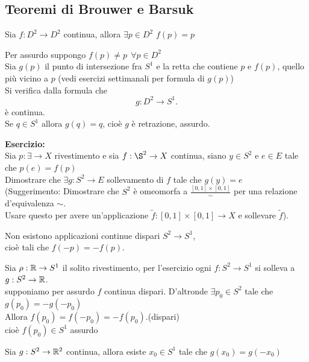 \documentclass[12px]{article}
\begin{document}
\subsection{Teoremi di Brouwer e Barsuk}
\begin{teo}[Brouwer]
	Sia $f:D^2 \rightarrow D^2$ continua, allora $\exists p\in D^2$ $f(p) = p$
\end{teo}
\begin{dimo}
	Per assurdo suppongo $f(p)\neq p \ \ \forall p\in D^2$\\
	Sia $g(p)$ il punto di intersezione fra  $S^1$ e la retta che contiene $p$ e $f(p)$, quello più vicino a  $p$ (vedi esercizi settimanali per formula di $g(p)$)\\
	Si verifica dalla formula che
	 \[
	g: D^2  \rightarrow S^1
	.\]
	è continua.\\
	Se $q\in S^1$ allora  $g(q) = q$, cioè $g$ è retrazione, assurdo.
\end{dimo}
\textbf{Esercizio:}\\
Sia $p:\exists \rightarrow X$ rivestimento e sia $f: \S^2 \rightarrow X$ continua, siano $y\in S^2$ e  $e\in E$ tale che  $p(e) = f(p)$\\
Dimostrare che  $\exists g: S^2 \rightarrow E$ sollevamento di $f$ tale che $g(y) = e$\\
(Suggerimento: Dimostrare che $S^2$ è omeomorfa a  $\frac{[0,1]\times[0,1]}{\sim}$  per una relazione d'equivalenza  $\sim$. \\
Usare questo per avere un'applicazione $\tilde f : [0,1]\times[0,1] \rightarrow X$ e sollevare $\tilde f$).\\
\begin{teo}[Borsuk]
	Non esistono applicazioni continue dispari $S^2 \rightarrow S^1$,\\ cioè tali che $f(-p) = -f(p)$.
\end{teo}
\begin{dimo}
	Sia $\rho : \mathbb{R} \rightarrow S^1$ il solito rivestimento, per l'esercizio ogni $f: S^2 \rightarrow S^1$ si solleva a $g: S^2 \rightarrow \mathbb{R}$.\\supponiamo per assurdo $f$ continua dispari. D'altronde $\exists p_0\in S^2$ tale che $g(p_0)= -g(-p_0)$\\
	Allora $f(p_0)= f(-p_0) = -f(p_0)$.\hfill (dispari)\\
	cioè $f(p_0) \in S^1$ assurdo
\end{dimo}
\begin{coro}
	Sia $g: S^2 \rightarrow \mathbb{R}^2$ continua, allora esiste $x_0\in S^1$ tale che $g(x_0) = g(-x_0)$
\end{coro}
\end{document}

